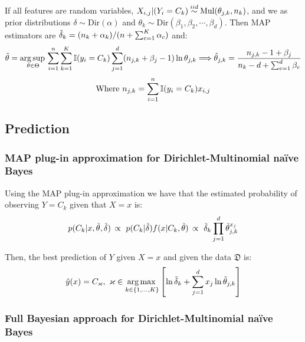 If all features are  random variables, $X_{i,j}|(Y_i=C_k)\dist{iid}\text{Mul}(\theta_{j,k},n_k)$, and we as prior distributions $\delta\sim\text{Dir}(\alpha)$ and $\theta_k\sim\text{Dir}(\beta_1,\beta_2,\cdots,\beta_d)$. Then MAP estimators are $\Tilde{\delta}_k = (n_k+\alpha_k)/(n+\sum_{c=1}^K\alpha_c)$ and:
\begin{equation*}
    \Tilde{\theta} = \operatorname*{arg\,sup\,}_{\theta\in\Theta}  \sum_{i=1}^n\sum_{k=1}^K\operatorname{\mathbb{I}}(y_i=C_k)\sum_{j=1}^d(n_{j,k}+\beta_j-1)\ln \theta_{j,k} \Longrightarrow \hat{\theta}_{j,k} = \frac{n_{j,k}-1+\beta_j}{n_k-d+\sum_{e=1}^d\beta_e}
\end{equation*}
\begin{equation*}
    \text{Where } n_{j,k}=\sum_{i=1}^n\operatorname{\mathbb{I}}(y_i=C_k)x_{i,j}
\end{equation*}

\subsection{Prediction}

\subsubsection*{MAP plug-in approximation for Dirichlet-Multinomial naïve Bayes}
Using the MAP plug-in approximation we have that the estimated probability of observing $Y=C_k$ given that $X=x$ is:
\begin{equation*}
    p(C_k|x, \Tilde{\theta},\Tilde{\delta})\, \propto\ p(C_k|\Tilde{\delta})f(x|C_k,\Tilde{\theta})\, \propto\  \Tilde{\delta}_k\prod_{j=1}^d \Tilde{\theta}_{j,k}^{x_j} 
\end{equation*}

Then, the best prediction of $Y$ given $X=x$ and given the data $\mathfrak{D}$ is:
\begin{equation*}
    \hat{y}(x) = C_{\varkappa},\ \varkappa \in \operatorname*{arg\,max\,}_{k\in \{1,\dots,K\}} \left[ \ln \Tilde{\delta}_k+\sum_{j=1}^d x_j\ln \Tilde{\theta}_{j,k} \right]
\end{equation*}

\subsubsection*{Full Bayesian approach for Dirichlet-Multinomial naïve Bayes}

